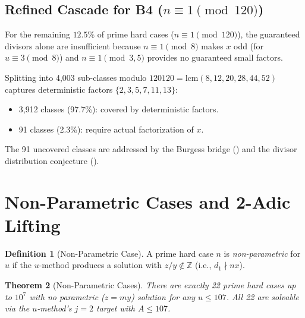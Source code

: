 \documentclass[11pt,a4paper]{article}
\theoremstyle{plain}
\newtheorem{theorem}{Theorem}[section]
\theoremstyle{plain}
\theoremstyle{definition}
\newtheorem{definition}[theorem]{Definition}
\numberwithin{equation}{section}
\begin{document}
\subsection{Refined Cascade for B4 ($n \equiv 1 \pmod{120}$)}

For the remaining $12.5\%$ of prime hard cases ($n \equiv 1 \pmod{120}$), the guaranteed divisors alone are insufficient because $n \equiv 1 \pmod{8}$ makes $x$ odd (for $u \equiv 3 \pmod{8}$) and $n \equiv 1 \pmod{3, 5}$ provides no guaranteed small factors.

Splitting into 4,003 sub-classes modulo $120120 = \mathrm{lcm}(8, 12, 20, 28, 44, 52)$ captures deterministic factors $\{2, 3, 5, 7, 11, 13\}$:
\begin{itemize}[noitemsep]
  \item 3,912 classes (97.7\%): covered by deterministic factors.
  \item 91 classes (2.3\%): require actual factorization of $x$.
\end{itemize}

The 91 uncovered classes are addressed by the Burgess bridge () and the divisor distribution conjecture ().

\clearpage

\section{Non-Parametric Cases and 2-Adic Lifting}

\begin{definition}[Non-Parametric Case]
A prime hard case $n$ is \emph{non-parametric} for $u$ if the $u$-method produces a solution with $z/y \notin \mathbb{Z}$ (i.e., $d_1 \nmid nx$).
\end{definition}

\begin{theorem}[Non-Parametric Cases]\label{thm:nonparam}
There are exactly 22 prime hard cases up to $10^7$ with no parametric ($z = my$) solution for any $u \leq 107$. All 22 are solvable via the $u$-method's $j = 2$ target with $A \leq 107$.
\end{theorem}
\end{document}
